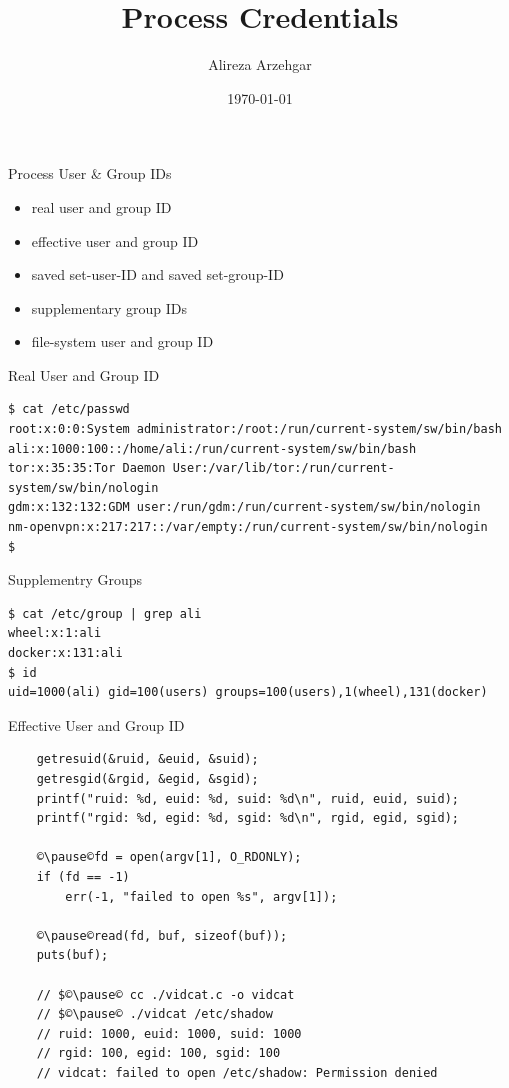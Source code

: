 \documentclass[xcolor={rgb}]{beamer}
\author{Alireza Arzehgar}
\title{Process Credentials}
\date{\today}
\newcommand{\pitem}{\pause\item}
\begin{document}
	\begin{frame}[plain]
		\titlepage
	\end{frame}

	\begin{frame}{Process User \& Group IDs}
	\begin{itemize}
		\pitem real user and group ID
		\pitem effective user and group ID
		\pitem saved set-user-ID and saved set-group-ID
		\pitem supplementary group IDs
		\pitem file-system user and group ID
	\end{itemize}
	\end{frame}


	\begin{frame}[fragile]{Real User and Group ID}
		\begin{verbatim}
$ cat /etc/passwd 
root:x:0:0:System administrator:/root:/run/current-system/sw/bin/bash
ali:x:1000:100::/home/ali:/run/current-system/sw/bin/bash
tor:x:35:35:Tor Daemon User:/var/lib/tor:/run/current-system/sw/bin/nologin
gdm:x:132:132:GDM user:/run/gdm:/run/current-system/sw/bin/nologin
nm-openvpn:x:217:217::/var/empty:/run/current-system/sw/bin/nologin
$
		\end{verbatim}
	\end{frame}

	\begin{frame}[fragile]{Supplementry Groups}
		\begin{verbatim}
$ cat /etc/group | grep ali
wheel:x:1:ali
docker:x:131:ali
$ id
uid=1000(ali) gid=100(users) groups=100(users),1(wheel),131(docker)
		\end{verbatim}
	\end{frame}

	\begin{frame}[fragile]{Effective User and Group ID}
		\begin{verbatim}
    getresuid(&ruid, &euid, &suid);
    getresgid(&rgid, &egid, &sgid);
    printf("ruid: %d, euid: %d, suid: %d\n", ruid, euid, suid);
    printf("rgid: %d, egid: %d, sgid: %d\n", rgid, egid, sgid);

    ©\pause©fd = open(argv[1], O_RDONLY);
    if (fd == -1)
        err(-1, "failed to open %s", argv[1]);

    ©\pause©read(fd, buf, sizeof(buf));
    puts(buf);

    // $©\pause© cc ./vidcat.c -o vidcat 
    // $©\pause© ./vidcat /etc/shadow
    // ruid: 1000, euid: 1000, suid: 1000
    // rgid: 100, egid: 100, sgid: 100
    // vidcat: failed to open /etc/shadow: Permission denied
		\end{verbatim}
	\end{frame}
	
\end{document}
